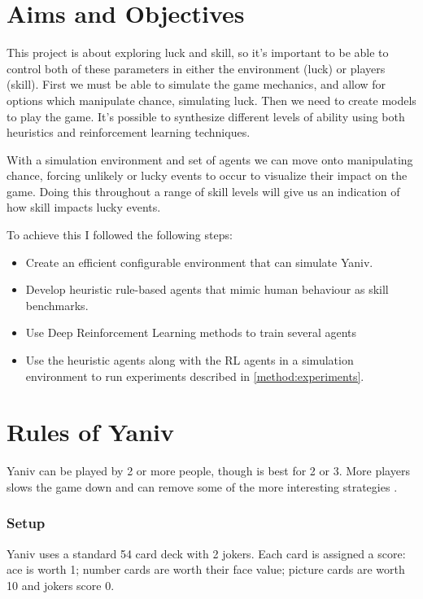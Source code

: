 \documentclass[../main.tex]{subfiles}
\begin{document}
\section{Aims and Objectives} \label{intro:aims}
This project is about exploring luck and skill, so it's important to be able to control both of these parameters in either the environment (luck) or players (skill). First we must be able to simulate the game mechanics, and allow for options which manipulate chance, simulating luck. Then we need to create models to play the game. It's possible to synthesize different levels of ability using both heuristics and reinforcement learning techniques. 

With a simulation environment and set of agents we can move onto manipulating chance, forcing unlikely or lucky events to occur to visualize their impact on the game. Doing this throughout a range of skill levels will give us an indication of how skill impacts lucky events. 

To achieve this I followed the following steps:
\begin{itemize}
    \item Create an efficient configurable environment that can simulate Yaniv.
    \item Develop heuristic rule-based agents that mimic human behaviour as skill benchmarks.
    \item Use Deep Reinforcement Learning methods to train several agents 
    \item Use the heuristic agents along with the RL agents in a simulation environment to run experiments described in \autoref{method:experiments}.
\end{itemize}


\section{Rules of Yaniv} \label{intro:rules}
Yaniv can be played by 2 or more people, though is best for 2 or 3. More players slows the game down and can remove some of the more interesting strategies \cite{noauthor_rules_nodate}. 

\subsubsection{Setup}
Yaniv uses a standard 54 card deck with 2 jokers. Each card is assigned a score: ace is worth 1; number cards are worth their face value; picture cards are worth 10 and jokers score 0. 
\end{document}
